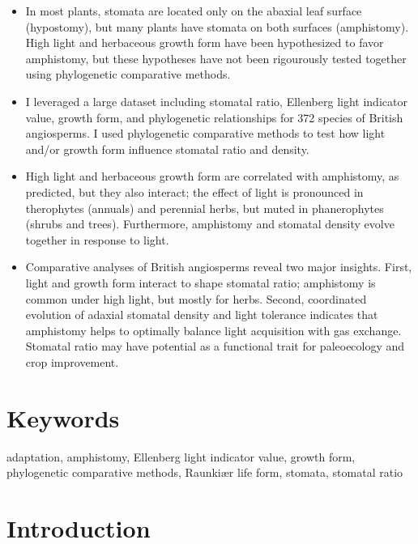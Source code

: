 \documentclass[12pt, oneside]{article}
\begin{document}
\begin{itemize}

	\item In most plants, stomata are located only on the abaxial leaf surface (hypostomy), but many plants have stomata on both surfaces (amphistomy). High light and herbaceous growth form have been hypothesized to favor amphistomy, but these hypotheses have not been rigourously tested together using phylogenetic comparative methods.
	
	\item I leveraged a large dataset including stomatal ratio, Ellenberg light indicator value, growth form, and phylogenetic relationships for 372 species of British angiosperms. I used phylogenetic comparative methods to test how light and/or growth form influence stomatal ratio and density.
	
	\item High light and herbaceous growth form are correlated with amphistomy, as predicted, but they also interact; the effect of light is pronounced in therophytes (annuals) and perennial herbs, but muted in phanerophytes (shrubs and trees). Furthermore, amphistomy and stomatal density evolve together in response to light.
	
	\item Comparative analyses of British angiosperms reveal two major insights. First, light and growth form interact to shape stomatal ratio; amphistomy is common under high light, but mostly for herbs. Second, coordinated evolution of adaxial stomatal density and light tolerance indicates that amphistomy helps to optimally balance light acquisition with gas exchange. Stomatal ratio may have potential as a functional trait for paleoecology and crop improvement.
	
\end{itemize}

\section*{Keywords}

adaptation, amphistomy, Ellenberg light indicator value, growth form, phylogenetic comparative methods, Raunki\ae r life form, stomata, stomatal ratio

\clearpage

\section*{Introduction}
\end{document}
